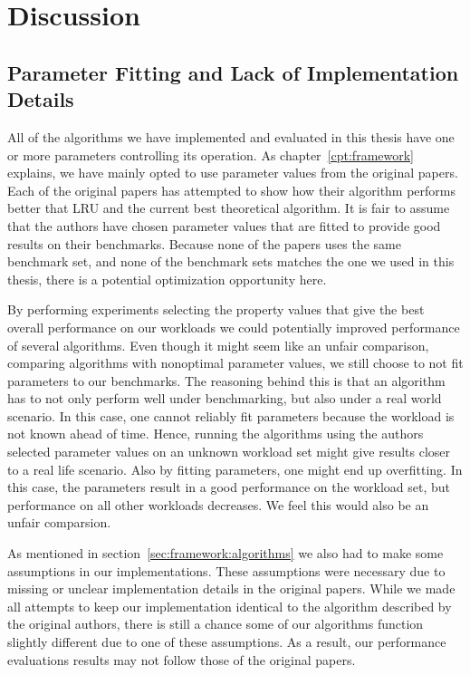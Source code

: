 
\chapter{Discussion}
\label{cpt:discussion}

\section{Parameter Fitting and Lack of Implementation Details}

All of the algorithms we have implemented and evaluated in this thesis have one or more parameters controlling its operation.
As chapter~\ref{cpt:framework} explains, we have mainly opted to use parameter values from the original papers.
Each of the original papers has attempted to show how their algorithm performs better that LRU and the current best theoretical algorithm.
It is fair to assume that the authors have chosen parameter values that are fitted to provide good results on their benchmarks.
Because none of the papers uses the same benchmark set, and none of the benchmark sets matches the one we used in this thesis, there is a potential optimization opportunity here.

By performing experiments selecting the property values that give the best overall performance on our workloads we could potentially improved performance of several algorithms.
Even though it might seem like an unfair comparison, comparing algorithms with nonoptimal parameter values, we still choose to not fit parameters to our benchmarks.
The reasoning behind this is that an algorithm has to not only perform well under benchmarking, but also under a real world scenario.
In this case, one cannot reliably fit parameters because the workload is not known ahead of time.
Hence, running the algorithms using the authors selected parameter values on an unknown workload set might give results closer to a real life scenario.
Also by fitting parameters, one might end up overfitting.
In this case, the parameters result in a good performance on the workload set, but performance on all other workloads decreases.
We feel this would also be an unfair comparsion.

As mentioned in section~\ref{sec:framework:algorithms} we also had to make some assumptions in our implementations.
These assumptions were necessary due to missing or unclear implementation details in the original papers.
While we made all attempts to keep our implementation identical to the algorithm described by the original authors, there is still a chance some of our algorithms function slightly different due to one of these assumptions.
As a result, our performance evaluations results may not follow those of the original papers.



